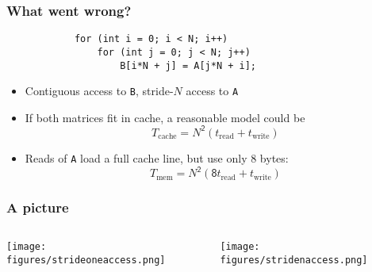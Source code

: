 \documentclass[dvipsnames,presentation,aspectratio=169,14pt]{beamer}
\begin{document}
\begin{frame}[fragile]
  \frametitle{What went wrong?}

  \begin{center}
\begin{verbatim}
            for (int i = 0; i < N; i++)
                for (int j = 0; j < N; j++)
                    B[i*N + j] = A[j*N + i];
\end{verbatim}
    \vskip 5pt

  \end{center}
  \begin{itemize}[itemsep=8pt]
  \item Contiguous access to \texttt{B}, stride-$N$ access to \texttt{A}

  \item If both matrices fit in cache, a reasonable model could be
    \begin{equation*}
    T_{\text{cache}} = N^{\mathsf{2}}(t_\text{read} + t_\text{write})
  \end{equation*}

  \item Reads of \texttt{A} load a full cache line, but use only 8 bytes:
    \begin{equation*}
       T_\text{mem} = N^{\mathsf 2}(\mathsf 8 t_\text{read} + t_\text{write})
    \end{equation*}
  \end{itemize}
\end{frame}

\begin{frame}
  \frametitle{A picture}
  \begin{columns}
    \begin{column}{0.45\textwidth}
      \begin{center}
        \texttt{[image: figures/strideoneaccess.png]}
      \end{center}
    \end{column}
    \begin{column}{0.45\textwidth}
      \begin{center}
        \texttt{[image: figures/stridenaccess.png]}
      \end{center}
    \end{column}
  \end{columns}
\end{frame}
\end{document}
